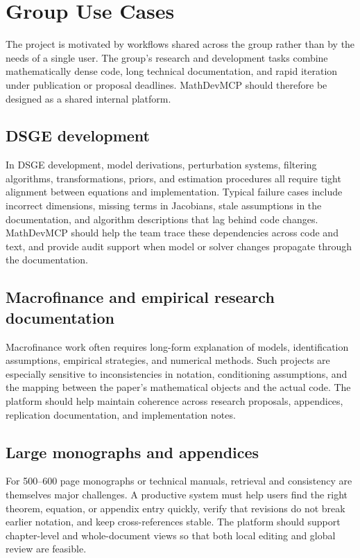 \chapter{Group Use Cases}

The project is motivated by workflows shared across the group rather than by the needs of a single user. The group's research and development tasks combine mathematically dense code, long technical documentation, and rapid iteration under publication or proposal deadlines. MathDevMCP should therefore be designed as a shared internal platform.

\section{DSGE development}

In DSGE development, model derivations, perturbation systems, filtering algorithms, transformations, priors, and estimation procedures all require tight alignment between equations and implementation. Typical failure cases include incorrect dimensions, missing terms in Jacobians, stale assumptions in the documentation, and algorithm descriptions that lag behind code changes. MathDevMCP should help the team trace these dependencies across code and text, and provide audit support when model or solver changes propagate through the documentation.

\section{Macrofinance and empirical research documentation}

Macrofinance work often requires long-form explanation of models, identification assumptions, empirical strategies, and numerical methods. Such projects are especially sensitive to inconsistencies in notation, conditioning assumptions, and the mapping between the paper's mathematical objects and the actual code. The platform should help maintain coherence across research proposals, appendices, replication documentation, and implementation notes.

\section{Large monographs and appendices}

For 500--600 page monographs or technical manuals, retrieval and consistency are themselves major challenges. A productive system must help users find the right theorem, equation, or appendix entry quickly, verify that revisions do not break earlier notation, and keep cross-references stable. The platform should support chapter-level and whole-document views so that both local editing and global review are feasible.

